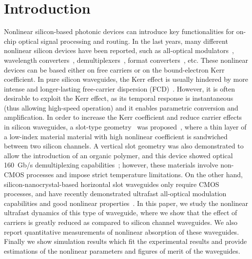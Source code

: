 \documentclass[10pt,letterpaper]{article}
\begin{document}
\section{Introduction}
Nonlinear silicon-based photonic devices can introduce key functionalities for on-chip optical signal processing and routing. In the last years, many different nonlinear silicon devices have been reported, such as all-optical modulators~\cite{Almeida2004b}, wavelength converters~\cite{Lee2009,Driscoll2010}, demultiplexers~\cite{Koos2009}, format converters~\cite{Astar2010}, etc. These nonlinear devices can be based either on free carriers or on the bound-electron Kerr coefficient. In pure silicon waveguides, the Kerr effect is usually hindered by more intense and longer-lasting free-carrier dispersion (FCD)~\cite{Foster2008,Osgood2009}. However, it is often desirable to exploit the Kerr effect, as its temporal response is instantaneous (thus allowing high-speed operation) and it enables parametric conversion and amplification. In order to increase the Kerr coefficient and reduce carrier effects in silicon waveguides, a slot-type geometry~\cite{Almeida2004} was proposed~\cite{Sanchis2007,Koos2007a,Zhang2010,Rukhlenko2012}, where a thin layer of a low-index material material with high nonlinear coefficient is sandwiched between two silicon channels. A vertical slot geometry was also demonstrated to allow the introduction of an organic polymer, and this device showed optical 160~Gb/s demultiplexing capabilities~\cite{Koos2009}; however, these materials involve non-CMOS processes and impose strict temperature limitations. On the other hand, silicon-nanocrystal-based horizontal slot waveguides only require CMOS processes, and have recently demonstrated ultrafast all-optical modulation capabilities and good nonlinear properties~\cite{Spano2009, Martinez2010a, Oton2010, Trita2011}. In this paper, we study the nonlinear ultrafast dynamics of this type of waveguide, where we show that the effect of carriers is greatly reduced as compared to silicon channel waveguides. We also report quantitative measurements of nonlinear absorption of these waveguides. Finally we show simulation results which fit the experimental results and provide estimations of the nonlinear parameters and figures of merit of the waveguides.
\end{document}
